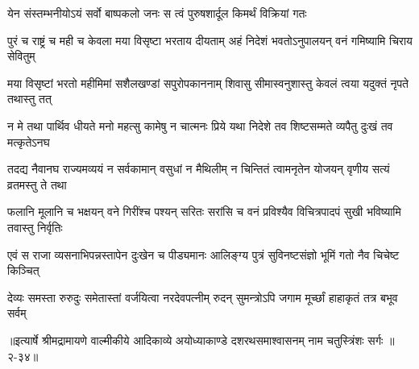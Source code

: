\twolineshloka
{येन संस्तम्भनीयोऽयं सर्वो बाष्पकलो जनः}
{स त्वं पुरुषशार्दूल किमर्थं विक्रियां गतः} %

\twolineshloka
{पुरं च राष्ट्रं च मही च केवला मया विसृष्टा भरताय दीयताम्}
{अहं निदेशं भवतोऽनुपालयन् वनं गमिष्यामि चिराय सेवितुम्} %

\twolineshloka
{मया विसृष्टां भरतो महीमिमां सशैलखण्डां सपुरोपकाननाम्}
{शिवासु सीमास्वनुशास्तु केवलं त्वया यदुक्तं नृपते तथास्तु तत्} %

\twolineshloka
{न मे तथा पार्थिव धीयते मनो महत्सु कामेषु न चात्मनः प्रिये}
{यथा निदेशे तव शिष्टसम्मते व्यपैतु दुःखं तव मत्कृतेऽनघ} %

\twolineshloka
{तदद्य नैवानघ राज्यमव्ययं न सर्वकामान् वसुधां न मैथिलीम्}
{न चिन्तितं त्वामनृतेन योजयन् वृणीय सत्यं व्रतमस्तु ते तथा} %

\twolineshloka
{फलानि मूलानि च भक्षयन् वने गिरींश्च पश्यन् सरितः सरांसि च}
{वनं प्रविश्यैव विचित्रपादपं सुखी भविष्यामि तवास्तु निर्वृतिः} %

\twolineshloka
{एवं स राजा व्यसनाभिपन्नस्तापेन दुःखेन च पीड्यमानः}
{आलिङ्ग्य पुत्रं सुविनष्टसंज्ञो भूमिं गतो नैव चिचेष्ट किञ्चित्} %

\twolineshloka
{देव्यः समस्ता रुरुदुः समेतास्तां वर्जयित्वा नरदेवपत्नीम्}
{रुदन् सुमन्त्रोऽपि जगाम मूर्च्छां हाहाकृतं तत्र बभूव सर्वम्} %


॥इत्यार्षे श्रीमद्रामायणे वाल्मीकीये आदिकाव्ये अयोध्याकाण्डे दशरथसमाश्वासनम् नाम चतुस्त्रिंशः सर्गः ॥२-३४॥
